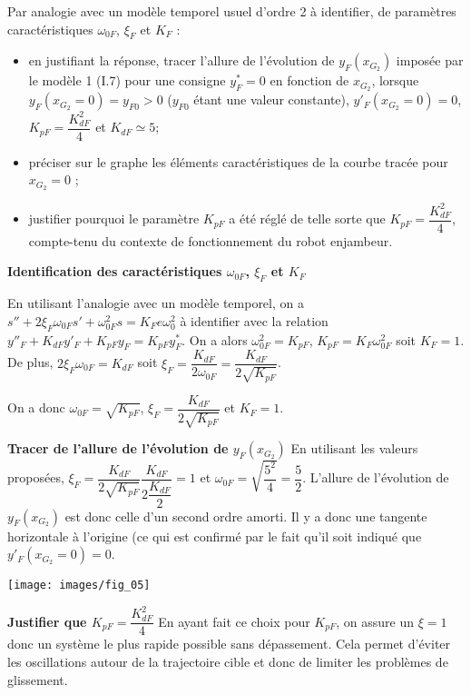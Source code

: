 \documentclass[11pt]{article}
\begin{document}

\UPSTIquestion Par analogie avec un modèle temporel usuel d’ordre 2 à identifier, de paramètres caractéristiques $\omega_{0F}$, $\xi_F$ et $K_F$ :
\begin{itemize}
\item en justifiant la réponse, tracer l’allure de l’évolution de  $y_F\left(x_{G_2}\right)$  imposée par le modèle 1 (I.7) pour une consigne $y_F^*=0$ en fonction de $x_{G_2}$, lorsque $y_F\left(x_{G_2}=0\right)=y_{F0}>0$
 ($y_{F0}$ étant une valeur constante), $y'_F\left(x_{G_2}=0\right)=0$, $K_{pF}=\dfrac{K^2_{dF}}{4}$ et $K_{dF}\simeq 5$; 
 \item préciser sur le graphe les éléments caractéristiques de la courbe tracée pour $x_{G_2}=0$ ;
\item justifier pourquoi le paramètre $K_{pF}$ a été réglé de telle sorte que $K_{pF}=\dfrac{K^2_{dF}}{4}$, compte-tenu du contexte de fonctionnement du robot enjambeur.
\end{itemize}

\begin{UPSTIcorrige}

\textbf{Identification des  caractéristiques $\omega_{0F}$, $\xi_F$ et $K_F$}

En utilisant l'analogie avec un modèle temporel, on a $s'' + 2\xi_F\omega_{0F} s' + \omega_{0F}^2 s = K_Fe\omega_0^2$ à identifier avec la relation $y''_F+K_{dF}y'_F+K_{pF}y_F=K_{pF}y^*_F$.
On a alors  $\omega_{0F}^2 =K_{pF}$, $K_{pF} = K_F\omega_{0F}^2$ soit $K_F=1$. De plus, $2\xi_F\omega_{0F} = K_{dF}$ soit $\xi_F = \dfrac{K_{dF}}{2\omega_{0F}}= \dfrac{K_{dF}}{2\sqrt{K_{pF}}}$.

On a donc $\omega_{0F}=\sqrt{K_{pF}}$, $\xi_F=\dfrac{K_{dF}}{2\sqrt{K_{pF}}} $ et $K_F=1$.


\textbf{Tracer de l’allure de l’évolution de  $y_F\left(x_{G_2}\right)$}
En utilisant les valeurs proposées, $\xi_F=\dfrac{K_{dF}}{2\sqrt{K_{pF}}}\dfrac{K_{dF}}{2\dfrac{K_{dF}}{2}} =1 $ et $\omega_{0F}=\sqrt{\dfrac{5^2}{4}}=\dfrac{5}{2}$. L'allure de l'évolution de $y_F\left(x_{G_2}\right)$ est donc celle d'un second ordre amorti. Il y a donc une tangente horizontale à l'origine (ce qui est confirmé par le fait qu'il soit indiqué que $y'_F\left(x_{G_2}=0\right)=0$.

\begin{center}
\texttt{[image: images/fig\_05]}
\end{center}
\textbf{Justifier que $K_{pF}=\dfrac{K^2_{dF}}{4}$}
En ayant fait ce choix pour $K_{pF}$, on assure un $\xi=1$ donc un système le plus rapide possible sans dépassement. 
Cela permet d'éviter les oscillations autour de la trajectoire cible et donc de limiter les problèmes de glissement. 

\end{UPSTIcorrige}
\end{document}
